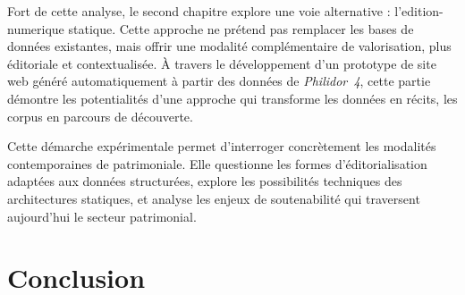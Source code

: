 \documentclass[12pt,twoside]{book}
\begin{document}
	Fort de cette analyse, le second chapitre explore une voie alternative : l'\gls{edition-numerique} statique. Cette approche ne prétend pas remplacer les bases de données existantes, mais offrir une modalité complémentaire de valorisation, plus éditoriale et contextualisée. À travers le développement d'un prototype de site web généré automatiquement à partir des données de \textit{Philidor~4}, cette partie démontre les potentialités d'une approche qui transforme les données en récits, les corpus en parcours de découverte.
	
	Cette démarche expérimentale permet d'interroger concrètement les modalités contemporaines de  patrimoniale. Elle questionne les formes d'éditorialisation adaptées aux données structurées, explore les possibilités techniques des architectures statiques, et analyse les enjeux de soutenabilité qui traversent aujourd'hui le secteur patrimonial.
	
	
	
	
	
	\chapter*{Conclusion}
	
	
	
	\newpage{\pagestyle{empty}\cleardoublepage}
	
	
	\appendix %
	
	
	
	\newpage{\pagestyle{empty}\cleardoublepage}
	
	
	\backmatter %
	
	\printglossaries
	\listoftables
	\listoffigures
	\tableofcontents
\end{document}
